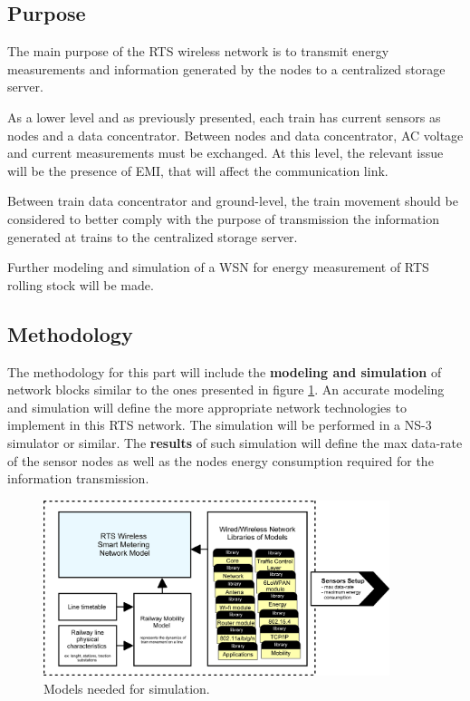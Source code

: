 \subsection{Purpose}

The main purpose of the \ac{RTS} wireless network is to transmit energy measurements and information generated by the nodes to a centralized storage server. 

As a lower level and as previously presented, each train has current sensors as nodes and a data concentrator. Between nodes and data concentrator, \ac{AC} voltage and current measurements must be exchanged.
At this level, the relevant issue will be the presence of \ac{EMI}, that will affect the communication link.

Between train data concentrator and ground-level, the train movement should be considered to better comply with the purpose of transmission the information generated at trains to the centralized storage server. 

Further modeling and simulation of a \ac{WSN} for energy measurement of \ac{RTS} rolling stock will be made.



\subsection{Methodology}

The methodology for this part will include the \textbf{modeling and simulation} of network blocks similar to the ones presented in figure \ref{fig:4.methodWireless}. An accurate modeling and simulation will define the more appropriate network technologies to implement in this \ac{RTS} network. 
The simulation will be performed in a NS-3 simulator or similar.
The \textbf{results} of such simulation will define the max data-rate of the sensor nodes as well as the nodes energy consumption required for the information transmission.

\begin{figure}[h!]
	\centering
	\includegraphics[width=0.9\textwidth,keepaspectratio]{figures/40.Method/methodWireless}
	\caption{Models needed for simulation.}
	\label{fig:4.methodWireless}
\end{figure}

